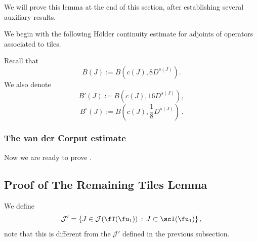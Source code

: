 
    We will prove this lemma at the end of this section, after establishing several auxiliary results.

    We begin with the following H\"older continuity estimate for adjoints of operators associated to tiles.

    

    Recall that
    \begin{equation*}
        B(J) := B(c(J), 8D^{s(J)}).
    \end{equation*}
    We also denote
    \begin{equation*}
     B'(J) := B(c(J), 16D^{s(J)}),
    \end{equation*}
    \begin{equation*}
     B^\circ{}(J) := B(c(J), \frac{1}{8}D^{s(J)})\, .
    \end{equation*}



    



    


    


    


    

    

\subsubsection{The van der Corput estimate}
\label{subsubsec-van-der-corput}

    

    Now we are ready to prove .
    

\subsection{Proof of The Remaining Tiles Lemma}
    \label{subsec-rest-tiles}
    We define
    $$
        \mathcal{J}' = \{J \in \mathcal{J}(\fT(\fu_1)) \, : \, J \subset \scI(\fu_1)\}\,,
    $$
    note that this is different from the $\mathcal{J}'$ defined in the previous subsection.

